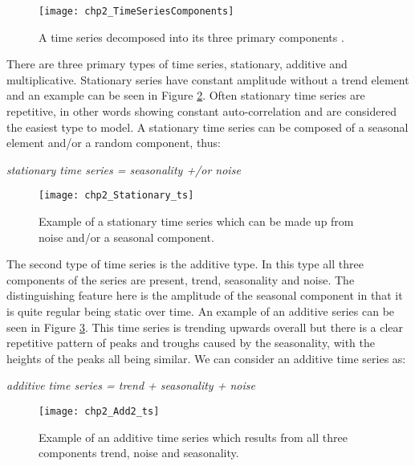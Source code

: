 \begin{figure}[tbph!]
\centering
\texttt{[image: chp2\_TimeSeriesComponents]}
\caption[Time series decomposed into primary components]{A time series decomposed into its three primary components \citep{CoghlanR}.}
\label{fig:TimeSeriesComponents}
\end{figure}

There are three primary types of time series, stationary, additive and multiplicative. Stationary series have constant amplitude without a trend element and an example can be seen in Figure \ref{fig:Stationary_ts}. Often stationary time series are repetitive, in other words showing constant auto-correlation and are considered the easiest type to model. A stationary time series can be composed of a seasonal element and/or a random component, thus:

\begin{center}
\textit{stationary time series = seasonality +/or noise}
\end{center}

\begin{figure}[tbph!]
\centering
\texttt{[image: chp2\_Stationary\_ts]}
\caption[A stationary time series]{Example of a stationary time series which can be made up from noise and/or a seasonal component.}
\label{fig:Stationary_ts}
\end{figure}

The second type of time series is the additive type. In this type all three components of the series are present, trend, seasonality and noise. The distinguishing feature here is the amplitude of the seasonal component in that it is quite regular being static over time. An example of an additive series can be seen in Figure \ref{fig:Add2_ts}. This time series is trending upwards overall but there is a clear repetitive pattern of peaks and troughs caused by the seasonality, with the heights of the peaks all being similar. We can consider an additive time series as:

\begin{center}
\textit{additive time series = trend + seasonality + noise}
\end{center}

\begin{figure}[tbph!]
\centering
\texttt{[image: chp2\_Add2\_ts]}
\caption[An additive time series]{Example of an additive time series which results from all three components trend, noise and seasonality.}
\label{fig:Add2_ts}
\end{figure}

